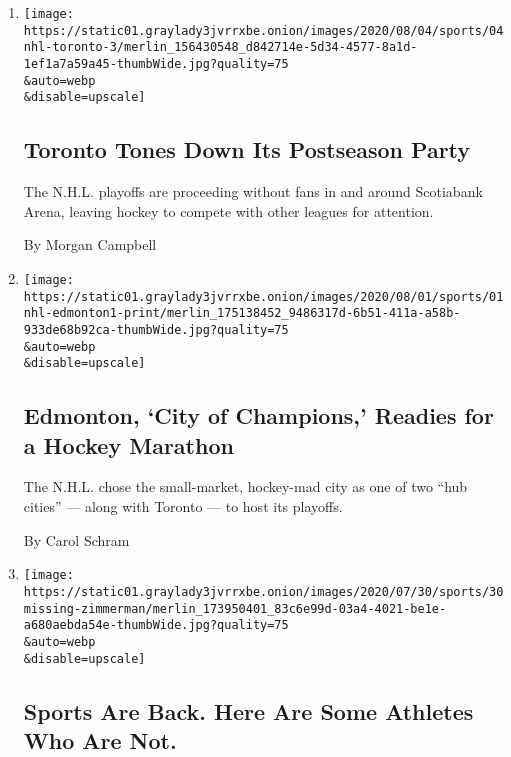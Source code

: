 \begin{enumerate}
\def\labelenumi{\arabic{enumi}.}
\item
  \href{/2020/08/04/sports/toronto-nhl-playoffs.html}{}

  \texttt{[image: https://static01.graylady3jvrrxbe.onion/images/2020/08/04/sports/04nhl-toronto-3/merlin\_156430548\_d842714e-5d34-4577-8a1d-1ef1a7a59a45-thumbWide.jpg?quality=75\\\&auto=webp\\\&disable=upscale]}

  \hypertarget{toronto-tones-down-its-postseason-party}{%
  \subsection{Toronto Tones Down Its Postseason
  Party}\label{toronto-tones-down-its-postseason-party}}

  The N.H.L. playoffs are proceeding without fans in and around
  Scotiabank Arena, leaving hockey to compete with other leagues for
  attention.

  By Morgan Campbell
\item
  \href{/2020/08/01/sports/hockey/edmonton-nhl-playoffs.html}{}

  \texttt{[image: https://static01.graylady3jvrrxbe.onion/images/2020/08/01/sports/01nhl-edmonton1-print/merlin\_175138452\_9486317d-6b51-411a-a58b-933de68b92ca-thumbWide.jpg?quality=75\\\&auto=webp\\\&disable=upscale]}

  \hypertarget{edmonton-city-of-champions-readies-for-a-hockey-marathon}{%
  \subsection{Edmonton, `City of Champions,' Readies for a Hockey
  Marathon}\label{edmonton-city-of-champions-readies-for-a-hockey-marathon}}

  The N.H.L. chose the small-market, hockey-mad city as one of two ``hub
  cities'' --- along with Toronto --- to host its playoffs.

  By Carol Schram
\item
  \href{/2020/07/30/sports/players-opt-out.html}{}

  \texttt{[image: https://static01.graylady3jvrrxbe.onion/images/2020/07/30/sports/30missing-zimmerman/merlin\_173950401\_83c6e99d-03a4-4021-be1e-a680aebda54e-thumbWide.jpg?quality=75\\\&auto=webp\\\&disable=upscale]}

  \hypertarget{sports-are-back-here-are-some-athletes-who-are-not}{%
  \subsection{Sports Are Back. Here Are Some Athletes Who Are
  Not.}\label{sports-are-back-here-are-some-athletes-who-are-not}}


\end{enumerate}
